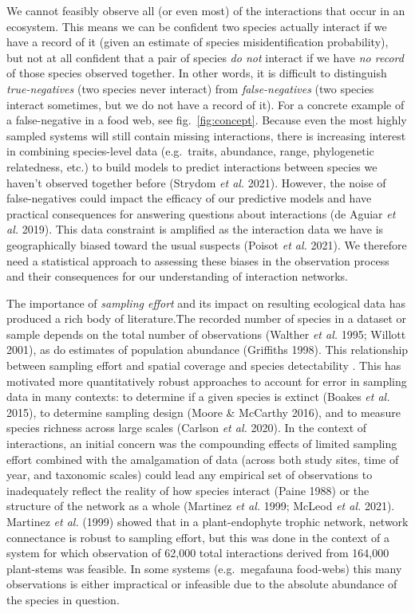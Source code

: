 \documentclass[11pt]{article}
\begin{document}
We cannot feasibly observe all (or even most) of the interactions that
occur in an ecosystem. This means we can be confident two species
actually interact if we have a record of it (given an estimate of
species misidentification probability), but not at all confident that a
pair of species \emph{do not} interact if we have \emph{no record} of
those species observed together. In other words, it is difficult to
distinguish \emph{true-negatives} (two species never interact) from
\emph{false-negatives} (two species interact sometimes, but we do not
have a record of it). For a concrete example of a false-negative in a
food web, see fig.~\ref{fig:concept}. Because even the most highly
sampled systems will still contain missing interactions, there is
increasing interest in combining species-level data (e.g.~traits,
abundance, range, phylogenetic relatedness, etc.) to build models to
predict interactions between species we haven't observed together before
(Strydom \emph{et al.} 2021). However, the noise of false-negatives
could impact the efficacy of our predictive models and have practical
consequences for answering questions about interactions (de Aguiar
\emph{et al.} 2019). This data constraint is amplified as the
interaction data we have is geographically biased toward the usual
suspects (Poisot \emph{et al.} 2021). We therefore need a statistical
approach to assessing these biases in the observation process and their
consequences for our understanding of interaction networks.

The importance of \emph{sampling effort} and its impact on resulting
ecological data has produced a rich body of literature.The recorded
number of species in a dataset or sample depends on the total number of
observations (Walther \emph{et al.} 1995; Willott 2001), as do estimates
of population abundance (Griffiths 1998). This relationship between
sampling effort and spatial coverage and species detectability . This
has motivated more quantitatively robust approaches to account for error
in sampling data in many contexts: to determine if a given species is
extinct (Boakes \emph{et al.} 2015), to determine sampling design (Moore
\& McCarthy 2016), and to measure species richness across large scales
(Carlson \emph{et al.} 2020). In the context of interactions, an initial
concern was the compounding effects of limited sampling effort combined
with the amalgamation of data (across both study sites, time of year,
and taxonomic scales) could lead any empirical set of observations to
inadequately reflect the reality of how species interact (Paine 1988) or
the structure of the network as a whole (Martinez \emph{et al.} 1999;
McLeod \emph{et al.} 2021). Martinez \emph{et al.} (1999) showed that in
a plant-endophyte trophic network, network connectance is robust to
sampling effort, but this was done in the context of a system for which
observation of 62,000 total interactions derived from 164,000
plant-stems was feasible. In some systems (e.g.~megafauna food-webs)
this many observations is either impractical or infeasible due to the
absolute abundance of the species in question.
\end{document}
